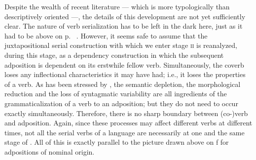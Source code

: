 Despite the wealth of recent literature — which is more typologically than descriptively oriented —, the details of this development are not yet sufficiently clear. The nature of verb serialization has to be left in the dark here, just as it had to be above on p.~\pageref{page37}\chk%
. However, it seems safe to assume that the juxtapositional serial construction with which we enter stage \textsc{ii} is reanalyzed, during this stage, as a dependency construction in which the subsequent adposition is dependent on its erstwhile fellow verb. Simultaneously, the coverb loses any inflectional characteristics it may have had; i.e., it loses the properties of a verb. As has been stressed by \citet[82--86]{Givón1975}, the semantic depletion, the morphological reduction and the loss of syntagmatic variability are all ingredients of the grammaticalization of a verb to an adposition; but they do not need to occur exactly simultaneously. Therefore, there is no sharp boundary between (co-)verb and adposition. Again, since these processes may affect different verbs at different times, not all the serial verbs of a language are necessarily at one and the same stage of . All of this is exactly parallel to the picture drawn above on \pageref{page102}%
f  for adpositions of nominal origin.

